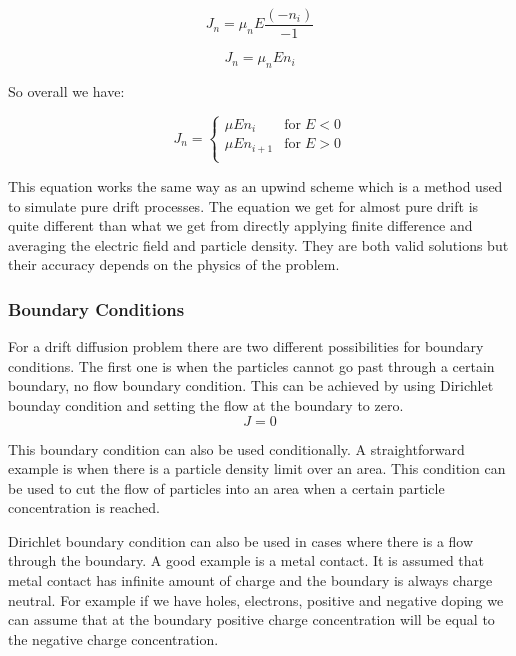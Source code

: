 \begin{equation}
J_n =\mu_n E\frac{(-n_i)}{-1}
\end{equation}

\begin{equation}
J_n =\mu_n E n_i
\end{equation}

So overall we have:

\begin{equation}
J_n = \begin{cases}
       \mu E n_i  & \text{for}  \;  E<0 \\
       \mu E n_{i+1}  & \text{for}  \; E>0 \\
     \end{cases}
\end{equation}

This equation works the same way as an upwind scheme which is a method used to simulate pure drift processes. The equation we get for almost pure drift is quite different than what we get from directly applying finite difference and averaging the electric field and particle density. They are both valid solutions but their accuracy depends on the physics of the problem.

\subsubsection{Boundary Conditions}

For a drift diffusion problem there are two different possibilities for boundary conditions. The first one is when the particles cannot go past through a certain boundary, no flow boundary condition. This can be achieved by using Dirichlet bounday condition and setting the flow at the boundary to zero. 
\begin{equation}
J=0
\end{equation}

This boundary condition can also be used conditionally. A straightforward example is when there is a particle density limit over an area. This condition can be used to cut the flow of particles into an area when a certain particle concentration is reached. 

Dirichlet boundary condition can also be used in cases where there is a flow through the boundary. A good example is a metal contact. It is assumed that metal contact has infinite amount of charge and the boundary is always charge neutral. For example if we have holes, electrons, positive and negative doping we can assume that at the boundary positive charge concentration will be equal to the negative charge concentration. 

